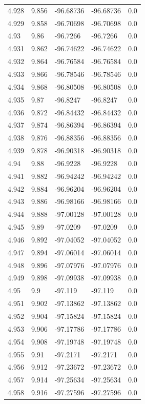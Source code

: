 \begin{tabular}{lllll}
4.928 & 9.856 & -96.68736 & -96.68736 & 0.0 \\
4.929 & 9.858 & -96.70698 & -96.70698 & 0.0 \\
4.93 & 9.86 & -96.7266 & -96.7266 & 0.0 \\
4.931 & 9.862 & -96.74622 & -96.74622 & 0.0 \\
4.932 & 9.864 & -96.76584 & -96.76584 & 0.0 \\
4.933 & 9.866 & -96.78546 & -96.78546 & 0.0 \\
4.934 & 9.868 & -96.80508 & -96.80508 & 0.0 \\
4.935 & 9.87 & -96.8247 & -96.8247 & 0.0 \\
4.936 & 9.872 & -96.84432 & -96.84432 & 0.0 \\
4.937 & 9.874 & -96.86394 & -96.86394 & 0.0 \\
4.938 & 9.876 & -96.88356 & -96.88356 & 0.0 \\
4.939 & 9.878 & -96.90318 & -96.90318 & 0.0 \\
4.94 & 9.88 & -96.9228 & -96.9228 & 0.0 \\
4.941 & 9.882 & -96.94242 & -96.94242 & 0.0 \\
4.942 & 9.884 & -96.96204 & -96.96204 & 0.0 \\
4.943 & 9.886 & -96.98166 & -96.98166 & 0.0 \\
4.944 & 9.888 & -97.00128 & -97.00128 & 0.0 \\
4.945 & 9.89 & -97.0209 & -97.0209 & 0.0 \\
4.946 & 9.892 & -97.04052 & -97.04052 & 0.0 \\
4.947 & 9.894 & -97.06014 & -97.06014 & 0.0 \\
4.948 & 9.896 & -97.07976 & -97.07976 & 0.0 \\
4.949 & 9.898 & -97.09938 & -97.09938 & 0.0 \\
4.95 & 9.9 & -97.119 & -97.119 & 0.0 \\
4.951 & 9.902 & -97.13862 & -97.13862 & 0.0 \\
4.952 & 9.904 & -97.15824 & -97.15824 & 0.0 \\
4.953 & 9.906 & -97.17786 & -97.17786 & 0.0 \\
4.954 & 9.908 & -97.19748 & -97.19748 & 0.0 \\
4.955 & 9.91 & -97.2171 & -97.2171 & 0.0 \\
4.956 & 9.912 & -97.23672 & -97.23672 & 0.0 \\
4.957 & 9.914 & -97.25634 & -97.25634 & 0.0 \\
4.958 & 9.916 & -97.27596 & -97.27596 & 0.0 \\

\end{tabular}
